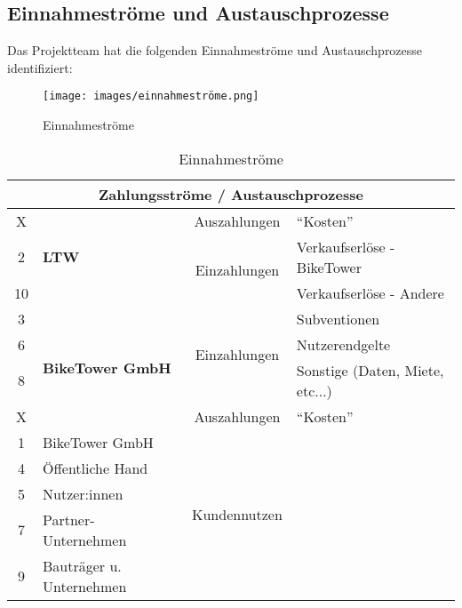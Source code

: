 \subsection{Einnahmeströme und Austauschprozesse}

Das Projektteam hat die folgenden Einnahmeströme und Austauschprozesse identifiziert:

\begin{figure}[H]
  \centering
  \texttt{[image: images/einnahmeströme.png]}
  \caption{Einnahmeströme}
  \label{fig:einnahmestroeme}
\end{figure}

\begin{table}[H]
  \centering
  \begin{tabular}{clcl}
    \multicolumn{4}{c}{\textbf{Zahlungsströme / Austauschprozesse}}                                                 \\
    \toprule
    X  & \multirow{3}{*}{\textbf{LTW}}            & Auszahlungen                  & \enquote{Kosten}                \\
    2  &                                          & \multirow{2}{*}{Einzahlungen} & Verkaufserlöse - BikeTower      \\
    10 &                                          &                               & Verkaufserlöse - Andere         \\
    \midrule
    3  & \multirow{4}{*}{\textbf{BikeTower GmbH}} & \multirow{3}{*}{Einzahlungen} & Subventionen                    \\
    6  &                                          &                               & Nutzerendgelte                  \\
    8  &                                          &                               & Sonstige (Daten, Miete, etc...) \\
    X  &                                          & Auszahlungen                  & \enquote{Kosten}                \\
    \midrule
    1  & BikeTower GmbH                           & \multirow{5}{*}{Kundennutzen}                                   \\
    4  & Öffentliche Hand                                                                                           \\
    5  & Nutzer:innen                                                                                               \\
    7  & Partner-Unternehmen                                                                                        \\
    9  & Bauträger u. Unternehmen                                                                                   \\
    \bottomrule
  \end{tabular}
  \caption{Einnahmeströme}
  \label{tab:einnahmestroeme}
\end{table}
